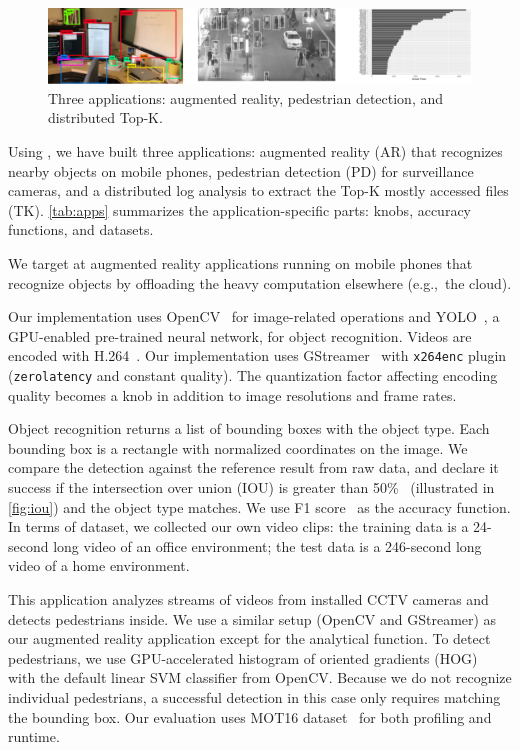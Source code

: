 \begin{figure}
  \centering
  \includegraphics[width=\columnwidth]{figures/apps.pdf}
  \caption{Three \awstream{} applications: augmented reality, pedestrian
    detection, and distributed Top-K.}
  \label{fig:three-apps}
\end{figure}

Using \awstream{}, we have built three applications: augmented reality (AR) that
recognizes nearby objects on mobile phones, pedestrian detection (PD) for
surveillance cameras, and a distributed log analysis to extract the Top-K mostly
accessed files (TK). \autoref{tab:apps} summarizes the application-specific
parts: knobs, accuracy functions, and datasets.

 We target at augmented reality applications running on
mobile phones that recognize objects by offloading the heavy computation
elsewhere (e.g.,~the cloud).

Our implementation uses OpenCV~\cite{opencvlibrary} for image-related operations
and YOLO~\cite{darknet13, redmon2016yolo9000}, a GPU-enabled pre-trained neural
network, for object recognition. Videos are encoded with
H.264~\cite{richardson2011h}. Our implementation uses GStreamer~\cite{gstreamer}
with \texttt{x264enc} plugin (\texttt{zerolatency} and constant quality). The
quantization factor affecting encoding quality becomes a knob in addition to
image resolutions and frame rates.

Object recognition returns a list of bounding boxes with the object type. Each
bounding box is a rectangle with normalized coordinates on the image. We compare
the detection against the reference result from raw data, and declare it success
if the intersection over union (IOU) is greater than
50\%~\cite{everingham2010pascal} (illustrated in \autoref{fig:iou}) and the
object type matches. We use F1 score~\cite{van1979information} as the accuracy
function. In terms of dataset, we collected our own video clips: the training
data is a 24-second long video of an office environment; the test data is a
246-second long video of a home environment.



 This application analyzes streams of videos from
installed CCTV cameras and detects pedestrians inside. We use a similar setup
(OpenCV and GStreamer) as our augmented reality application except for the
analytical function. To detect pedestrians, we use GPU-accelerated histogram of
oriented gradients (HOG)~\cite{dalal2005histograms} with the default linear SVM
classifier from OpenCV. Because we do not recognize individual pedestrians, a
successful detection in this case only requires matching the bounding box. Our
evaluation uses MOT16 dataset~\cite{milan2016mot16} for both profiling and
runtime.

